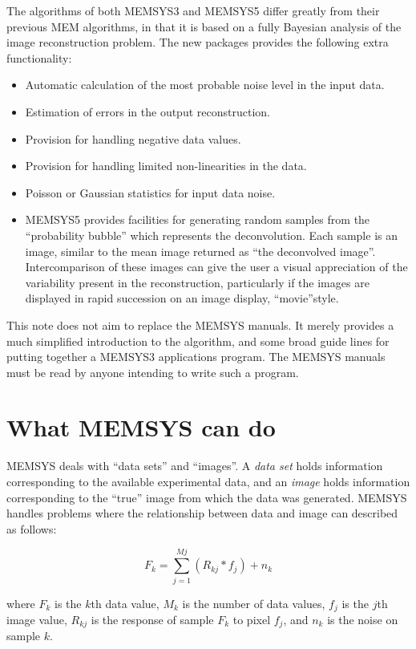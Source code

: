 The algorithms of both MEMSYS3 and MEMSYS5 differ greatly from their previous 
MEM algorithms, in
that it is based on a fully Bayesian analysis of the image reconstruction
problem. The new packages provides the following extra functionality:
\begin {itemize}
\item Automatic calculation of the most probable noise level in the input 
data.
\item Estimation of errors in the output reconstruction.
\item Provision for handling negative data values.
\item Provision for handling limited non-linearities in the data.
\item Poisson or Gaussian statistics for input data noise.
\item MEMSYS5 provides facilities for generating random samples from the 
``probability bubble'' which represents the deconvolution. Each sample is an 
image, similar to the mean image returned as ``the deconvolved image''. 
Intercomparison of these images can give the user a visual appreciation of the 
variability present in the reconstruction, particularly if the images are 
displayed in rapid succession on an image display, ``movie''style.
\end {itemize}

This note does not aim to replace the MEMSYS manuals. It merely provides 
a much simplified introduction to the algorithm, and some broad guide lines for 
putting together a MEMSYS3 applications program. The MEMSYS manuals must be 
read by anyone intending to write such a program.

\section {What MEMSYS can do}
MEMSYS deals with ``data sets'' and ``images''. A {\em data set} holds
information corresponding to the available experimental data, and an {\em image}
holds information corresponding to the ``true'' image from which the data was
generated. MEMSYS handles problems where the relationship between data and
image can described as follows: 

\begin {equation}
F_{k}=\sum_{j=1}^{Mj} (R_{kj}*f_{j})+n_{k}  \label {EQ:DATA}
\end {equation}

where $F_{k}$ is the $k$th data value, $M_{k}$ is the number of data values,
$f_{j}$ is the $j$th image value, $R_{kj}$ is the response of sample $F_{k}$ to
pixel $f_{j}$, and $n_{k}$ is the noise on sample $k$. 

